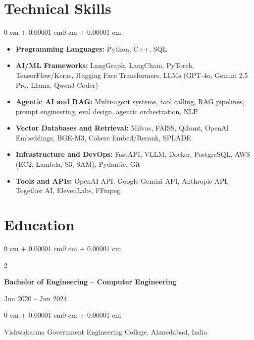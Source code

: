 \documentclass[10pt, letterpaper]{article}
\newenvironment{highlightsforbulletentries}{
    \begin{itemize}[
        topsep=0.10 cm,
        parsep=0.10 cm,
        partopsep=0pt,
        itemsep=0pt,
        leftmargin=10pt
    ]
}{
    \end{itemize}
}
\newenvironment{onecolentry}{
    \begin{adjustwidth}{0 cm + 0.00001 cm}{0 cm + 0.00001 cm}
}{
    \end{adjustwidth}
}
\newenvironment{twocolentry}[2][]{
    \onecolentry
    \def\secondColumn{#2}
    \setcolumnwidth{\fill, 5.5 cm}
    \begin{paracol}{2}
}{
    \switchcolumn \raggedleft \secondColumn
    \end{paracol}
    \endonecolentry
}
\begin{document}
    \section{Technical Skills}

    \begin{onecolentry}
        \begin{highlightsforbulletentries}
            \item \textbf{Programming Languages:} Python, C++, SQL
            \item \textbf{AI/ML Frameworks:} LangGraph, LangChain, PyTorch, TensorFlow/Keras, Hugging Face Transformers, LLMs (GPT-4o, Gemini 2.5 Pro, Llama, Qwen3-Coder)
            \item \textbf{Agentic AI and RAG:} Multi-agent systems, tool calling, RAG pipelines, prompt engineering, eval design, agentic orchestration, NLP
            \item \textbf{Vector Databases and Retrieval:} Milvus, FAISS, Qdrant, OpenAI Embeddings, BGE-M3, Cohere Embed/Rerank, SPLADE
            \item \textbf{Infrastructure and DevOps:} FastAPI, VLLM, Docker, PostgreSQL, AWS (EC2, Lambda, S3, SAM), Pydantic, Git
            \item \textbf{Tools and APIs:} OpenAI API, Google Gemini API, Anthropic API, Together AI, ElevenLabs, FFmpeg
        \end{highlightsforbulletentries}
    \end{onecolentry}

    \section{Education}

        \begin{twocolentry}{
            Jun 2020 -- Jun 2024
        }
            \textbf{Bachelor of Engineering -- Computer Engineering}
        \end{twocolentry}

        \vspace{0.10 cm}
        \begin{onecolentry}
            Vishwakarma Government Engineering College, Ahmedabad, India
        \end{onecolentry}

\end{document}
